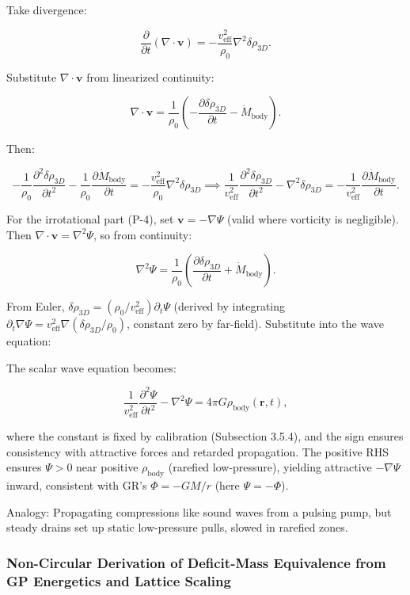 \documentclass{article}
\begin{document}
Take divergence:

\[
\frac{\partial}{\partial t} (\nabla \cdot \mathbf{v}) = -\frac{v_{\text{eff}}^2}{\rho_0} \nabla^2 \delta \rho_{3D}.
\]

Substitute $\nabla \cdot \mathbf{v}$ from linearized continuity:

\[
\nabla \cdot \mathbf{v} = \frac{1}{\rho_0} \left( -\frac{\partial \delta \rho_{3D}}{\partial t} - \dot{M}_{\text{body}} \right).
\]

Then:

\[
-\frac{1}{\rho_0} \frac{\partial^2 \delta \rho_{3D}}{\partial t^2} - \frac{1}{\rho_0} \frac{\partial \dot{M}_{\text{body}}}{\partial t} = -\frac{v_{\text{eff}}^2}{\rho_0} \nabla^2 \delta \rho_{3D} \implies \frac{1}{v_{\text{eff}}^2} \frac{\partial^2 \delta \rho_{3D}}{\partial t^2} - \nabla^2 \delta \rho_{3D} = -\frac{1}{v_{\text{eff}}^2} \frac{\partial \dot{M}_{\text{body}}}{\partial t}.
\]

For the irrotational part (P-4), set $\mathbf{v} = -\nabla \Psi$ (valid where vorticity is negligible). Then $\nabla \cdot \mathbf{v} = \nabla^2 \Psi$, so from continuity:

\[
\nabla^2 \Psi = \frac{1}{\rho_0} \left( \frac{\partial \delta \rho_{3D}}{\partial t} + \dot{M}_{\text{body}} \right).
\]

From Euler, $\delta \rho_{3D} = (\rho_0 / v_{\text{eff}}^2) \partial_t \Psi$ (derived by integrating $\partial_t \nabla \Psi = v_{\text{eff}}^2 \nabla (\delta \rho_{3D} / \rho_0)$, constant zero by far-field). Substitute into the wave equation:

The scalar wave equation becomes:

\[
\frac{1}{v_{\text{eff}}^2} \frac{\partial^2 \Psi}{\partial t^2} - \nabla^2 \Psi = 4\pi G \rho_{\text{body}}(\mathbf{r}, t),
\]

where the constant is fixed by calibration (Subsection 3.5.4), and the sign ensures consistency with attractive forces and retarded propagation. The positive RHS ensures $\Psi > 0$ near positive $\rho_{\text{body}}$ (rarefied low-pressure), yielding attractive $-\nabla \Psi$ inward, consistent with GR's $\Phi = -GM/r$ (here $\Psi = -\Phi$).

Analogy: Propagating compressions like sound waves from a pulsing pump, but steady drains set up static low-pressure pulls, slowed in rarefied zones.

\subsubsection{Non-Circular Derivation of Deficit-Mass Equivalence from GP Energetics and Lattice Scaling}
\end{document}
